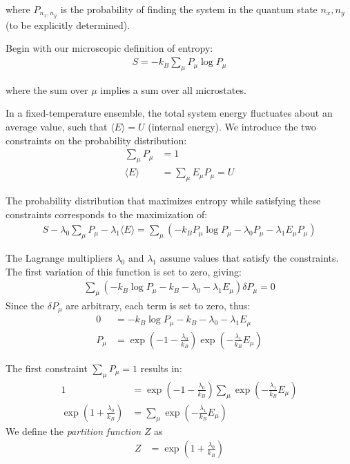\documentclass[book.tex]{subfiles}
\begin{document}
\noindent where $P_{n_x,n_y}$ is the probability of finding the system in the quantum state $n_x,n_y$ (to be explicitly determined).

Begin with our microscopic definition of entropy:
\begin{align}
S = - k_B \sum_\mu P_\mu \log P_\mu 
\end{align}

\noindent where the sum over $\mu$ implies a sum over all microstates.

In a fixed-temperature ensemble, the total system energy fluctuates about an average value, such that $\langle E \rangle = U$ (internal energy). We introduce the two constraints on the probability distribution:
\begin{align}
\sum_\mu P_\mu &= 1 \\
\langle E \rangle &= \sum_\mu E_\mu P_\mu = U 
\end{align}

The probability distribution that maximizes entropy while satisfying these constraints corresponds to the maximization of:
\begin{align}
S - \lambda_0 \sum_\mu P_\mu - \lambda_1 \langle E \rangle = \sum_\mu \left( - k_B P_\mu \log P_\mu - \lambda_0 P_\mu - \lambda_1 E_\mu P_\mu \right) 
\end{align}

The Lagrange multipliers $\lambda_0$ and $\lambda_1$ assume values that satisfy
the constraints. The first variation of this function is set to zero, giving:
\begin{align}
\sum_\mu \left( - k_B \log P_\mu - k_B - \lambda_0 - \lambda_1 E_\mu \right)\delta P_\mu = 0 
\end{align}
Since the $\delta P_\mu$ are arbitrary, each term is set to zero, thus:
\begin{align}
 0 &= -k_B \log P_\mu - k_B - \lambda_0 - \lambda_1 E_\mu  \\
 P_\mu &= \exp \left( -1-\frac{\lambda_0}{k_B}\right)\exp\left(-\frac{\lambda_1}{k_B}E_\mu \right) 
\end{align}

The first constraint $\sum_\mu P_\mu = 1$ results in:
\begin{align}
1 &= \exp \left( -1-\frac{\lambda_0}{k_B}\right)\sum_\mu \exp\left(-\frac{\lambda_1}{k_B}E_\mu \right) \\
\exp \left( 1 + \frac{\lambda_0}{k_B}\right) &= \sum_\mu \exp\left(-\frac{\lambda_1}{k_B}E_\mu \right) 
\end{align}
We define the \textit{partition function} $Z$ as
\begin{align}
    Z &= \exp \left( 1 + \frac{\lambda_0}{k_B}\right)
\end{align}
\end{document}

